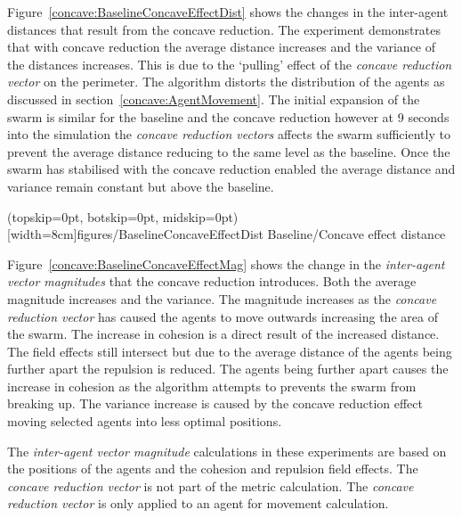 \documentclass{ieeeaccess}
\begin{document}
Figure~\ref{concave:BaselineConcaveEffectDist} shows the changes in the inter-agent distances that result from the concave reduction. The experiment demonstrates that with concave reduction the average distance increases and the variance of the distances increases. This is due to the `pulling' effect of the \textit{concave reduction vector} on the perimeter. The algorithm distorts the distribution of the agents as discussed in section~\ref{concave:AgentMovement}. The initial expansion of the swarm is similar for the baseline and the concave reduction however at 9 seconds into the simulation the \textit{concave reduction vectors} affects the swarm sufficiently to prevent the average distance reducing to the same level as the baseline. Once the swarm has stabilised with the concave reduction enabled the average distance and variance remain constant but above the baseline.

\Figure[t!](topskip=0pt, botskip=0pt, midskip=0pt)[width=8cm]{figures/BaselineConcaveEffectDist}
{Baseline/Concave effect distance \label{concave:BaselineConcaveEffectDist}}


Figure~\ref{concave:BaselineConcaveEffectMag} shows the change in the \textit{inter-agent vector magnitudes} that the concave reduction introduces. Both the average magnitude increases and the variance. The magnitude increases as the \textit{concave reduction vector} has caused the agents to move outwards increasing the area of the swarm. The increase in cohesion is a direct result of the increased distance. The field effects still intersect but due to the average distance of the agents being further apart the repulsion is reduced. The agents being further apart causes the increase in cohesion as the algorithm attempts to prevents the swarm from breaking up. The variance increase is caused by the concave reduction effect moving selected agents into less optimal positions.

The \textit{inter-agent vector magnitude} calculations in these experiments are based on the positions of the agents and the cohesion and repulsion field effects. The \textit{concave reduction vector} is not part of the metric calculation. The \textit{concave reduction vector} is only applied to an agent for movement calculation. 
\end{document}
